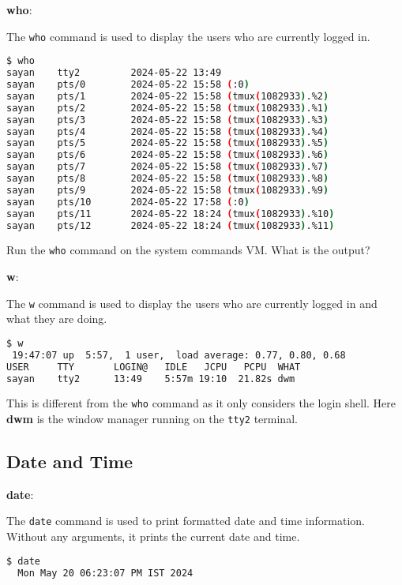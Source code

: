 \textbf{who}:

The \lstinline|who| command is used to display the users who are currently logged in.

\begin{lstlisting}[language=bash]
$ who
sayan    tty2         2024-05-22 13:49
sayan    pts/0        2024-05-22 15:58 (:0)
sayan    pts/1        2024-05-22 15:58 (tmux(1082933).%2)
sayan    pts/2        2024-05-22 15:58 (tmux(1082933).%1)
sayan    pts/3        2024-05-22 15:58 (tmux(1082933).%3)
sayan    pts/4        2024-05-22 15:58 (tmux(1082933).%4)
sayan    pts/5        2024-05-22 15:58 (tmux(1082933).%5)
sayan    pts/6        2024-05-22 15:58 (tmux(1082933).%6)
sayan    pts/7        2024-05-22 15:58 (tmux(1082933).%7)
sayan    pts/8        2024-05-22 15:58 (tmux(1082933).%8)
sayan    pts/9        2024-05-22 15:58 (tmux(1082933).%9)
sayan    pts/10       2024-05-22 17:58 (:0)
sayan    pts/11       2024-05-22 18:24 (tmux(1082933).%10)
sayan    pts/12       2024-05-22 18:24 (tmux(1082933).%11)
\end{lstlisting}

\begin{exercise}
  Run the \lstinline|who| command on the system commands VM.
  What is the output?
\end{exercise}

\textbf{w}:

The \lstinline|w| command is used to display the users who are currently logged in and what they are doing.

\begin{lstlisting}[language=bash]
$ w
 19:47:07 up  5:57,  1 user,  load average: 0.77, 0.80, 0.68
USER     TTY       LOGIN@   IDLE   JCPU   PCPU  WHAT
sayan    tty2      13:49    5:57m 19:10  21.82s dwm
\end{lstlisting}

This is different from the \lstinline|who| command as it only considers the login shell.
Here \textbf{dwm} is the window manager running on the \lstinline|tty2| terminal.

\subsection{Date and Time}

\textbf{date}:

The \lstinline|date| command is used to print formatted date and time information.
Without any arguments, it prints the current date and time.

\begin{lstlisting}[language=bash]
  $ date
  Mon May 20 06:23:07 PM IST 2024
\end{lstlisting}

